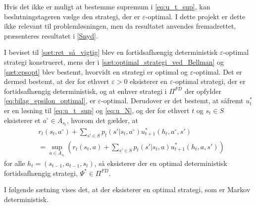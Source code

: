 


Hvis det ikke er muligt at bestemme supremum i \eqref{eq:u_t_sup}, kan beslutningstageren vælge den strategi, der er $\varepsilon$-optimal. I dette projekt er dette ikke relevant til problemløsningen, men da resultatet anvendes fremadrettet, præsenteres resultatet i \autoref{Snyd}.

I beviset til \autoref{sæt:ret_så_vigtig} blev en fortidsafhængig deterministisk $\varepsilon$-optimal strategi konstrueret, mens der i \autoref{sæt:optimal_strategi_ved_Bellman} og \autoref{sæt:epsopt} blev bestemt, hvorvidt en strategi er optimal og $\varepsilon$-optimal. Det er dermed bestemt, at der for ethvert $\varepsilon> 0$ eksisterer en $\varepsilon$-optimal strategi, der er fortidsafhængig deterministisk, og at enhver strategi i $\Pi^{FD}$ der opfylder \eqref{eq:bilag_epsilon_optimal}, er $\varepsilon$-optimal. Derudover er det bestemt, at såfremt $u_t^*$ er en løsning til \eqref{eq:u_t_sup} og \eqref{eq:u_N}, og der for ethvert $t$ og $s_t\in S$ eksisterer et $a^{\circ}\in A_{s_t}$, hvorom det gælder, at
%
\begin{align}\label{eq:deterministisk_fortidsafhængig_sup}
    &r_t(s_t,a^{\circ}) + \sum_{s'\in S}p_t(s' | s_t,a^{\circ})u^*_{t+1}(h_t, a^{\circ},s')\nonumber \\
    &= \sup_{a \in A_{s_t}}\left(r_t(s_t,a) +  \sum_{s'\in S}p_t(s' | s_t,a)u^*_{t+1}(h_t, a,s')\right)
\end{align}
for alle $h_t=(s_{t-1}, a_{t-1}, s_t)$, så eksisterer der en optimal deterministisk fortidsafhængig strategi, $\Psi^*\in \Pi^{FD}$.

I følgende sætning vises det, at der eksisterer en optimal strategi, som er Markov deterministisk.

